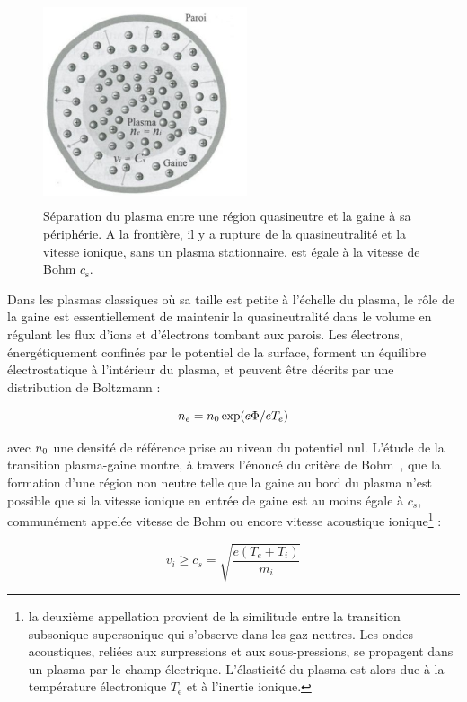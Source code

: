 \begin{refsection}
\begin{figure}[htbp]
\centering
\includegraphics[height=60mm,width=60mm]{figures/1-sheath.jpg}{\caption{Séparation
du plasma entre une région quasineutre et la gaine à sa
périphérie. A la frontière, il y a rupture de la quasineutralité et la vitesse
ionique, sans un plasma stationnaire, est égale à la vitesse de Bohm
$c_\text{s}$\parencite{Rax}.}\label{1-gaine1}}
\end{figure}

Dans les plasmas classiques où sa taille est petite
à l'échelle du plasma, le rôle de la gaine est essentiellement de
maintenir la quasineutralité dans le volume en régulant les flux d'ions et
d'électrons tombant aux parois. Les électrons, énergétiquement confinés par le
potentiel de la surface, forment un équilibre électrostatique à l'intérieur du
plasma, et peuvent être décrits par une distribution de Boltzmann :

\begin{equation}
	n_{e}=n{_{0}}\exp(e\Phi/eT_{e})
\end{equation}

avec $n{_{0}}$ une densité de référence prise au niveau du potentiel nul.
L'étude de la transition plasma-gaine montre,
à travers l'énoncé du critère de Bohm~\parencite{Stangeby}, que
la formation d'une région non neutre telle que la gaine au bord du plasma n'est
possible que si la vitesse ionique en entrée de gaine est au moins égale à
$c_s$, communément appelée vitesse de Bohm ou encore vitesse acoustique
ionique\footnote{la deuxième appellation provient de la similitude entre la
transition subsonique-supersonique qui s'observe dans les gaz neutres. Les
ondes acoustiques, reliées aux surpressions et aux sous-pressions, se propagent
dans un plasma par le champ électrique. L'élasticité du plasma est alors due à
la température électronique $T_\text{e}$ et à l'inertie ionique.} :

\begin{equation}
v_i\ge c_s=\sqrt{\frac{e (T_{e}+T_{i})}{m_{i}}}
\end{equation}


\end{refsection}

